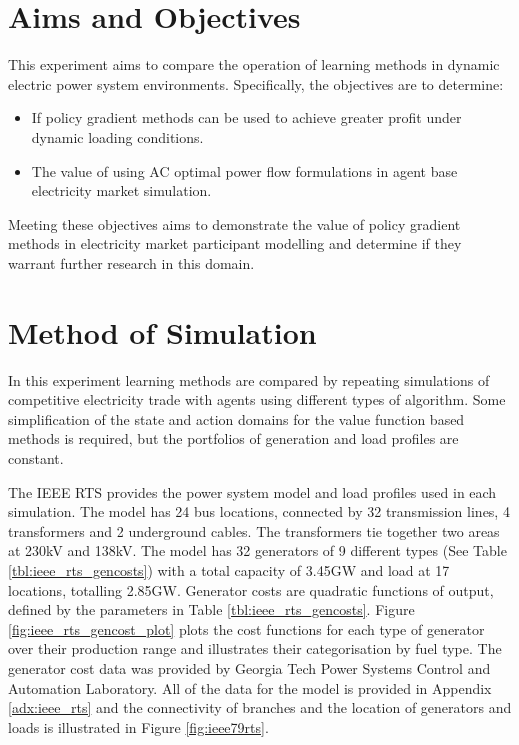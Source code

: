 \section{Aims and Objectives}
This experiment aims to compare the operation of learning methods in dynamic
electric power system environments.  Specifically, the objectives are to
determine:
\begin{itemize}
  \item If policy gradient methods can be used to achieve greater profit under
  dynamic loading conditions.
  \item The value of using AC optimal power flow formulations in agent base
  electricity market simulation.
\end{itemize}
Meeting these objectives aims to demonstrate the value of policy gradient
methods in electricity market participant modelling and determine if they
warrant further research in this domain.

\section{Method of Simulation}
In this experiment learning methods are compared by repeating simulations
of competitive electricity trade with agents using different types of
algorithm. Some simplification of the state and action domains for the value
function based methods is required, but the portfolios of generation and load
profiles are constant.

The IEEE RTS provides the power system model and load profiles used in each
simulation.  The model has 24 bus locations, connected by 32 transmission lines,
4 transformers and 2 underground cables.  The transformers tie together two
areas at 230kV and 138kV.  The model has 32 generators of 9 different types (See
Table \ref{tbl:ieee_rts_gencosts}) with a total capacity of 3.45GW and load at
17 locations, totalling 2.85GW. Generator costs are quadratic functions of
output, defined by the parameters in Table \ref{tbl:ieee_rts_gencosts}. Figure
\ref{fig:ieee_rts_gencost_plot} plots the cost functions for each type of
generator over their production range and illustrates their categorisation by
fuel type.  The generator cost data was provided by Georgia Tech Power Systems
Control and Automation Laboratory.  All of the data for the model is provided in
Appendix \ref{adx:ieee_rts} and the connectivity of branches and the location of
generators and loads is illustrated in Figure \ref{fig:ieee79rts}.

